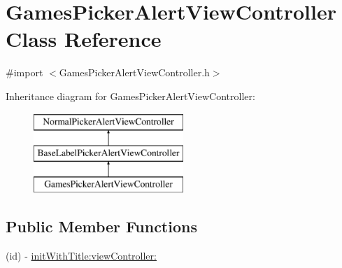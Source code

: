 \hypertarget{interface_games_picker_alert_view_controller}{
\section{GamesPickerAlertViewController Class Reference}
\label{interface_games_picker_alert_view_controller}
}


{\ttfamily \#import $<$GamesPickerAlertViewController.h$>$}

Inheritance diagram for GamesPickerAlertViewController:\begin{figure}[H]
\begin{center}
\leavevmode
\includegraphics[height=3.000000cm]{interface_games_picker_alert_view_controller}
\end{center}
\end{figure}
\subsection*{Public Member Functions}
\begin{DoxyCompactItemize}
\item 
(id) -\/ \hyperlink{interface_games_picker_alert_view_controller_ae9896c8779c32bd48bdcc6e5781269ab}{initWithTitle:viewController:}
\end{DoxyCompactItemize}

